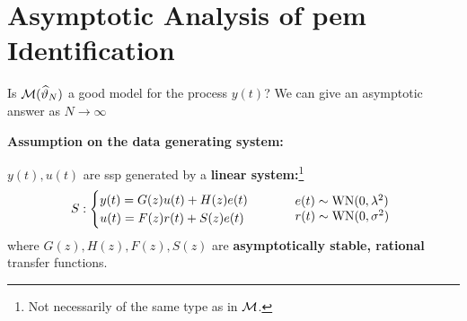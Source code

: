 \section{Asymptotic Analysis of \gls{pem} Identification}

Is $\mathcal{M}(\widehat{\vartheta}_{N})$ a good model for the process $y(t)$?
We can give an asymptotic answer as $N\to \infty$

\textbf{Assumption on the data generating system:}

$y(t),u(t)$ are \gls{ssp} generated by a \textbf{linear system:}\footnote{Not necessarily of the same type as in $\mathcal{M}$.}
\[
	S:
	\begin{cases}
		y(t) = G(z)u(t) + H(z)e(t)\\
		u(t) = F(z)r(t) + S(z)e(t)
	\end{cases}
	\qquad
	\begin{array}{l}
		e(t)\sim \operatorname{WN}(0,\lambda^2)\\
		r(t)\sim \operatorname{WN}(0,\sigma^2)
	\end{array}
\]
where $G(z),H(z),F(z),S(z)$ are \textbf{asymptotically stable, rational} transfer functions.

